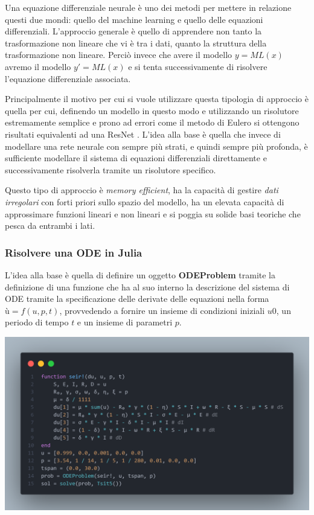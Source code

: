 Una equazione differenziale neurale è uno dei metodi per mettere in relazione
questi due mondi: quello del machine learning e quello delle equazioni differenziali.
L'approccio generale è quello di apprendere non tanto la trasformazione
non lineare che vi è tra i dati, quanto la struttura della trasformazione non 
lineare. Perciò invece che avere il modello $y = ML(x)$ avremo il modello 
$y' = ML(x)$ e si tenta successivamente di risolvere l'equazione differenziale 
associata.

Principalmente il motivo per cui si vuole utilizzare questa tipologia di approccio 
è quella per cui, definendo un modello in questo modo e utilizzando un risolutore
estremamente semplice e prono ad errori come il metodo di Eulero 
si ottengono risultati equivalenti ad una ResNet \cite{he2015deep}. L'idea alla base
è quella che invece di modellare una rete neurale con sempre più strati, e quindi 
sempre più profonda, è sufficiente modellare il sistema di equazioni differenziali
direttamente e successivamente risolverla tramite un risolutore specifico.

Questo tipo di approccio è \emph{memory efficient}, ha la capacità di gestire
\emph{dati irregolari} con forti priori sullo spazio del modello, ha un elevata
capacità di approssimare funzioni lineari e non lineari e si poggia su solide basi 
teoriche che pesca da entrambi i lati.

\subsubsection*{Risolvere una ODE in Julia}
L'idea alla base è quella di definire un oggetto \textbf{ODEProblem} tramite la 
definizione di una funzione che ha al suo interno la descrizione del sistema di ODE 
tramite la specificazione delle derivate delle equazioni nella forma $ù = f(u, p, t)$,
provvedendo a fornire un insieme di condizioni iniziali $u0$, un periodo di tempo $t$
e un insieme di parametri $p$.

\begin{minipage}{\linewidth}
    \centering
    \includegraphics[width=\textwidth]{img/fdefinition.png}
    \label{fig:ODE_Julia_example}
\end{minipage}

